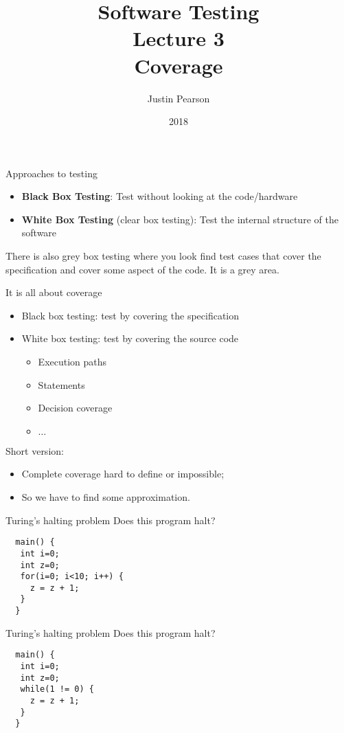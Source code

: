 \documentclass[handout]{beamer}
\title{Software Testing\\ Lecture 3\\ Coverage}
\author{Justin Pearson}
\date{2018}
\begin{document}
\lstset{language=C}

\begin{frame}
  \maketitle
\end{frame}

\begin{frame}{Approaches to testing}
  \begin{itemize}
  \item {\bf Black Box Testing}: Test without looking at the code/hardware
  \item {\bf White Box Testing} (clear box testing):  Test the internal
    structure of the software
  \end{itemize}
  There is also grey box testing where you look find test cases that cover the
  specification and cover some aspect of the code.  It is a grey area.  
\end{frame}
\begin{frame}{It is all about coverage}
  \begin{itemize}
  \item Black box testing: test by covering the specification
  \item White box testing: test by covering the source code
    \begin{itemize}
    \item Execution paths
    \item Statements
    \item Decision coverage
    \item $\ldots$
    \end{itemize}
  \end{itemize}
  Short version:
  \begin{itemize}
  \item  Complete coverage hard to define or impossible;
  \item  So we have to find some approximation.
  \end{itemize}
\end{frame}

\begin{frame}[fragile]{Turing's halting problem}
Does this program halt?
\begin{lstlisting}
  main() {
   int i=0;
   int z=0;
   for(i=0; i<10; i++) {
     z = z + 1;
   }
  }
\end{lstlisting}
\end{frame}
\begin{frame}[fragile]{Turing's halting problem}
Does this program halt?
\begin{lstlisting}
  main() {
   int i=0;
   int z=0;
   while(1 != 0) {
     z = z + 1;
   }
  }
\end{lstlisting}
\end{frame}
\end{document}
